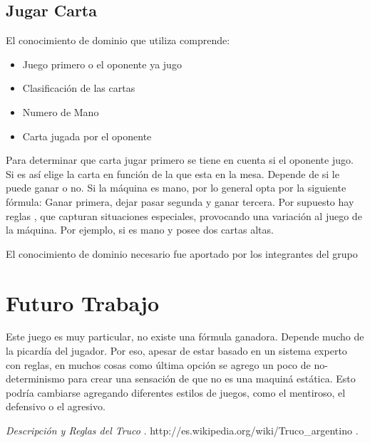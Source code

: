 \documentclass[12pt,a4paper]{article}
\begin{document}
\subsection{Jugar Carta}
El conocimiento de dominio que utiliza comprende:
\begin{itemize}
\item Juego primero o  el oponente ya jugo
\item Clasificaci\'on de las cartas
\item Numero de Mano
\item Carta jugada por el oponente
\end{itemize}

Para determinar que carta jugar primero se tiene en cuenta si el oponente jugo. Si es as\'i elige la carta en 
funci\'on de la que esta en la mesa. Depende de si le puede ganar o no.
Si la m\'aquina es mano, por lo general opta por la siguiente f\'ormula: Ganar primera, dejar pasar segunda y ganar tercera. 
Por supuesto hay reglas , que capturan situaciones especiales, provocando una variaci\'on al juego de la m\'aquina. Por ejemplo, si es mano y posee dos cartas altas.


El conocimiento de dominio necesario fue aportado por los integrantes del grupo 

\section{Futuro Trabajo}
Este juego es muy particular, no existe una f\'ormula ganadora. Depende mucho de la picard\'ia del jugador. Por eso, apesar de estar basado en un sistema experto
con reglas, en muchos cosas como \'ultima opci\'on se agrego un poco de no-determinismo para crear una sensaci\'on  de que no es una maquin\'a est\'atica. 
Esto podr\'ia cambiarse agregando diferentes estilos de juegos, como el mentiroso, el defensivo o el agresivo.   

\begin{thebibliography}{9}

	 \emph{Descripci\'on y Reglas del Truco }. 
	http://es.wikipedia.org/wiki/Truco\_argentino .

\end{thebibliography}
\end{document}
